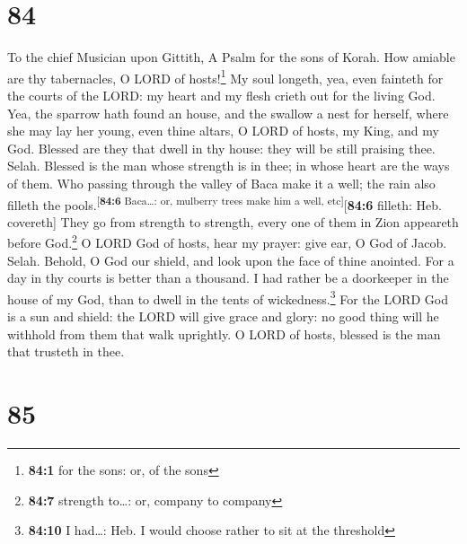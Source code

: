 \hypertarget{section-83}{%
\section{84}\label{section-83}}

To the chief Musician upon Gittith, A Psalm for the sons of Korah.
 How amiable are thy tabernacles, O LORD of
hosts!\footnote{\textbf{84:1} for the sons: or, of the sons}
 My soul longeth, yea, even fainteth for the courts of the
LORD: my heart and my flesh crieth out for the living God.
 Yea, the sparrow hath found an house, and the swallow a
nest for herself, where she may lay her young, even thine altars, O LORD
of hosts, my King, and my God.  Blessed are they that
dwell in thy house: they will be still praising thee. Selah.
 Blessed is the man whose strength is in thee; in whose
heart are the ways of them.  Who passing through the
valley of Baca make it a well; the rain also filleth the
pools.\textsuperscript{{[}\textbf{84:6} Baca\ldots: or, mulberry trees
make him a well, etc{]}}{[}\textbf{84:6} filleth: Heb. covereth{]}
 They go from strength to strength, every one of them in
Zion appeareth before God.\footnote{\textbf{84:7} strength to\ldots: or,
  company to company}  O LORD God of hosts, hear my
prayer: give ear, O God of Jacob. Selah.  Behold, O God
our shield, and look upon the face of thine anointed. 
For a day in thy courts is better than a thousand. I had rather be a
doorkeeper in the house of my God, than to dwell in the tents of
wickedness.\footnote{\textbf{84:10} I had\ldots: Heb. I would choose
  rather to sit at the threshold}  For the LORD God is a
sun and shield: the LORD will give grace and glory: no good thing will
he withhold from them that walk uprightly.  O LORD of
hosts, blessed is the man that trusteth in thee.

\hypertarget{section-84}{%
\section{85}\label{section-84}}

